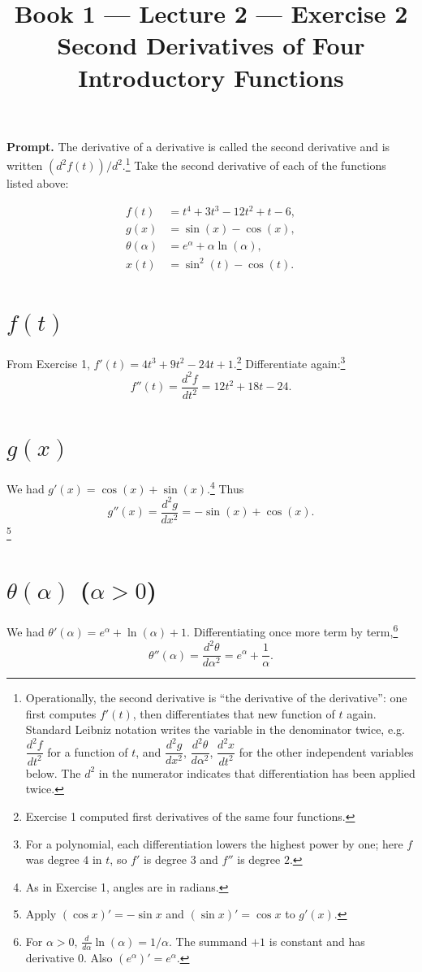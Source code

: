 \documentclass[11pt]{article}
\title{\textbf{Book 1 --- Lecture 2 --- Exercise 2}\\[2mm]
\large Second Derivatives of Four Introductory Functions}
\author{}
\date{}
\newcommand{\promptbox}[1]{%
  \begin{savenotes}%
  \begingroup\setlength{\fboxsep}{10pt}\noindent
  \colorbox{blue!8}{\parbox{\dimexpr\linewidth-2\fboxsep\relax}{\textbf{Prompt. }#1}}
  \endgroup
  \end{savenotes}%
}
\begin{document}
\maketitle

\promptbox{The derivative of a derivative is called the second derivative and is
written \((d^2 f(t))/d^2\).\footnote{Operationally, the second derivative is ``the
derivative of the derivative'': one first computes \(f'(t)\), then differentiates
that new function of \(t\) again. Standard Leibniz notation writes the variable in
the denominator twice, e.g.\ \(\dfrac{d^2 f}{dt^2}\) for a function of \(t\), and
\(\dfrac{d^2 g}{dx^2}\), \(\dfrac{d^2\theta}{d\alpha^2}\), \(\dfrac{d^2 x}{dt^2}\)
for the other independent variables below. The \(d^2\) in the numerator indicates
that differentiation has been applied twice.} Take the second derivative of each of
the functions listed above:}
\[
\begin{aligned}
f(t) &= t^4 + 3t^3 - 12t^2 + t - 6, \\
g(x) &= \sin(x) - \cos(x), \\
\theta(\alpha) &= e^\alpha + \alpha\ln(\alpha), \\
x(t) &= \sin^2(t) - \cos(t).
\end{aligned}
\]

\section*{\(f(t)\)}
From Exercise 1, \(f'(t)=4t^3+9t^2-24t+1\).\footnote{Exercise 1 computed first
derivatives of the same four functions.} Differentiate again:\footnote{For a
polynomial, each differentiation lowers the highest power by one; here \(f\) was
degree \(4\) in \(t\), so \(f'\) is degree \(3\) and \(f''\) is degree \(2\).}
\[
f''(t)=\frac{d^2f}{dt^2}=12t^2+18t-24.
\]

\section*{\(g(x)\)}
We had \(g'(x)=\cos(x)+\sin(x)\).\footnote{As in Exercise 1, angles are in radians.}
Thus
\[
g''(x)=\frac{d^2g}{dx^2}=-\sin(x)+\cos(x).
\]\footnote{Apply \((\cos x)'=-\sin x\) and \((\sin x)'=\cos x\) to \(g'(x)\).}

\section*{\(\theta(\alpha)\) (\(\alpha>0\))}
We had \(\theta'(\alpha)=e^\alpha+\ln(\alpha)+1\). Differentiating once more term by
term,\footnote{For \(\alpha>0\), \(\frac{d}{d\alpha}\ln(\alpha)=1/\alpha\). The summand
\(+1\) is constant and has derivative \(0\). Also \((e^\alpha)'=e^\alpha\).}
\[
\theta''(\alpha)=\frac{d^2\theta}{d\alpha^2}=e^\alpha+\frac{1}{\alpha}.
\]
\end{document}

